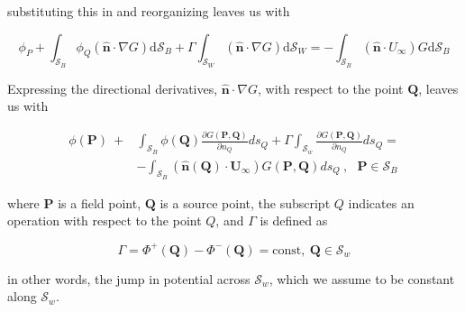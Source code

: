 substituting this in and reorganizing leaves us with

\begin{equation}
\phi_P + \int_{\mathcal{S}_B} \phi_Q \left( \mathbf{\hat{n}} \cdot \nabla G \right) \mathrm{d} \mathcal{S}_B + \Gamma \int_{\mathcal{S}_W} \left( \mathbf{\hat{n}} \cdot \nabla G \right) \mathrm{d} \mathcal{S}_W = -\int_{\mathcal{S}_B} \left( \mathbf{\hat{n}} \cdot U_{\infty} \right) G \mathrm{d} \mathcal{S}_B
\end{equation}

Expressing the directional derivatives, \(\mathbf{\hat{n}} \cdot \nabla G \), with respect to the point $\mathbf{Q}$, leaves us with 

\begin{equation}
\begin{aligned}
\label{eqn:continuousformulation}
\phi(\mathbf{P})~+ &\int_{\mathcal{S}_B} \phi(\mathbf{Q})\frac{\partial G(\mathbf{P},\mathbf{Q})}{\partial n_Q} ds_Q + \Gamma \int_{\mathcal{S}_w} \frac{\partial G (\mathbf{P},\mathbf{Q})}{\partial n_Q} ds_Q =\\
&- \int_{\mathcal{S}_B} \left(\mathbf{\hat{n}}(\mathbf{Q}) \cdot  \mathbf{U}_{\infty} \right) G(\mathbf{P},\mathbf{Q}) ds_Q~, ~~~\mathbf{P} \in \mathcal{S}_B
\end{aligned}
\end{equation}

where $\mathbf{P}$ is a field point, $\mathbf{Q}$ is a source point, the subscript \(Q\) indicates an operation with respect to the point \(Q\), and $\Gamma$ is defined as

\begin{equation} 
\Gamma = \Phi^+(\mathbf{Q}) - \Phi^-(\mathbf{Q}) = \mathrm{const}, ~\mathbf{Q} \in \mathcal{S}_w 
\end{equation} 

in other words, the jump in potential across $\mathcal{S}_w$, which we assume to be constant along $\mathcal{S}_w$.

%

